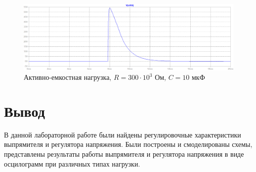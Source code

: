 \documentclass[a4paper, 12pt]{article}
\begin{document}
    \begin{figure}[H]
        \centering
        \includegraphics[scale=0.45]{R2-300k_C10u.png}
        \captionsetup{skip=0pt}
        \caption{Активно-емкостная нагрузка, $R=300\cdot10^3$ Ом, $C=10$ мкФ}
        \label{fig:R2-300k_C10u}
    \end{figure}


    \section{Вывод}
    В данной лабораторной работе были найдены регулировочные характеристики
    выпрямителя и регулятора напряжения. Были построены и смоделированы схемы,
    представлены результаты работы выпрямителя и регулятора напряжения в виде осцилограмм
    при различных типах нагрузки.
\end{document}
